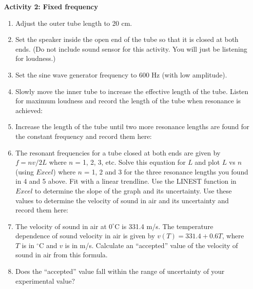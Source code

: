 {\noindent \bf Activity 2: Fixed frequency} \begin{enumerate}

\item Adjust the outer tube length to 20 cm.

\item Set the speaker inside the open end of the tube so that it is closed at both ends. (Do not include sound sensor for this activity. You will just be listening for loudness.)

\item Set the sine wave generator frequency to 600 Hz (with low amplitude).

\item Slowly move the inner tube to increase the effective length of the tube. Listen for maximum loudness and record the length of the tube when resonance is achieved:\vspace{10mm}

\item Increase the length of the tube until two more resonance lengths are found for the constant frequency and record them here:\vspace{10mm}


\item The resonant frequencies for a tube closed at both ends are given by 
$f=nv/2L$ where $n$ = 1, 2, 3, etc. Solve this equation for $L$ and plot $L$ 
vs $n$ (using $Excel$) where $n$ = 1, 2 and 3 for the three resonance lengths 
you found in 4 and 5 above. Fit with a linear trendline. Use the LINEST function in $Excel$ to determine the slope of the graph and its uncertainty. Use these values to determine the velocity of sound in air and its uncertainty and record them here:

\vspace{20mm}

\item The velocity of sound in air at $0^\circ$C is 331.4 m/s.  The temperature dependence of sound velocity in air is given by $v(T) = 331.4 + 0.6T$, where $T$ is in $^\circ$C and $v$ is in m/s. Calculate an ``accepted'' value of the velocity of sound in air from this formula.

\vspace{20mm}

\item Does the ``accepted'' value fall within the range of uncertainty of your experimental value?

\end{enumerate}
